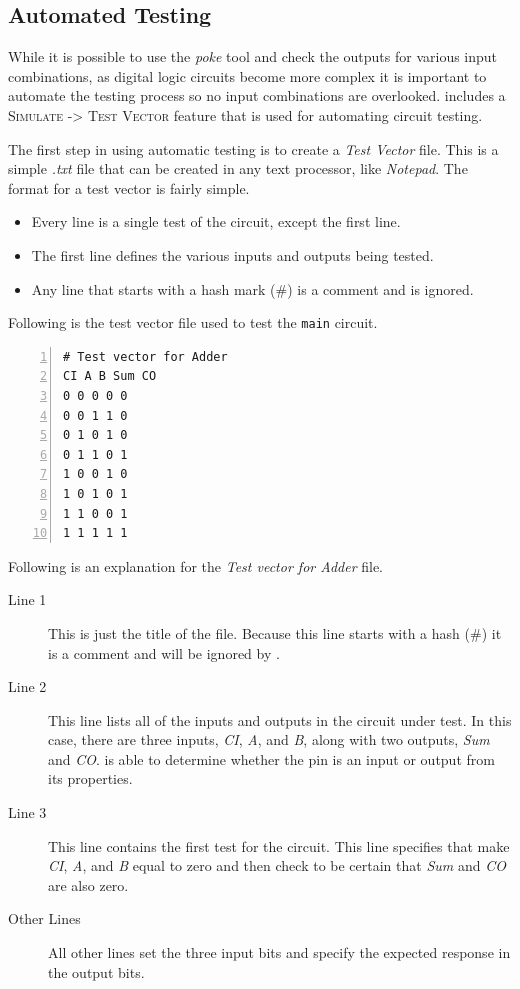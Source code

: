 \subsection{Automated Testing}

While it is possible to use the \textit{poke} tool and check the outputs for various input combinations, as digital logic circuits become more complex it is important to automate the testing process so no input combinations are overlooked. \LE includes a \textsc{Simulate -> Test Vector} feature that is used for automating circuit testing.

The first step in using automatic testing is to create a \textit{Test Vector} file. This is a simple \textit{.txt} file that can be created in any text processor, like \textit{Notepad}.  The format for a test vector is fairly simple.

\begin{itemize}
	\item Every line is a single test of the circuit, except the first line.
	\item The first line defines the various inputs and outputs being tested.
	\item Any line that starts with a hash mark (\#) is a comment and is ignored.
\end{itemize}

Following is the test vector file used to test the \lstinline[columns=fixed]|main| circuit.

\begin{Verbatim}[frame=lines,
numbers=left,
xleftmargin=10mm,
xrightmargin=10mm]
# Test vector for Adder
CI A B Sum CO
0 0 0 0 0
0 0 1 1 0
0 1 0 1 0
0 1 1 0 1
1 0 0 1 0
1 0 1 0 1
1 1 0 0 1
1 1 1 1 1
\end{Verbatim}

Following is an explanation for the \textit{Test vector for Adder} file.

\begin{description}
	\item[Line 1] This is just the title of the file. Because this line starts with a hash (\#) it is a comment and will be ignored by \LE.
	\item[Line 2] This line lists all of the inputs and outputs in the circuit under test. In this case, there are three inputs, \textit{CI}, \textit{A}, and \textit{B}, along with two outputs, \textit{Sum} and \textit{CO}. \LE is able to determine whether the pin is an input or output from its properties. 
	\item[Line 3] This line contains the first test for the circuit. This line specifies that \LE make \textit{CI}, \textit{A}, and \textit{B} equal to zero and then check to be certain that \textit{Sum} and \textit{CO} are also zero.
	\item[Other Lines] All other lines set the three input bits and specify the expected response in the output bits.
\end{description}

